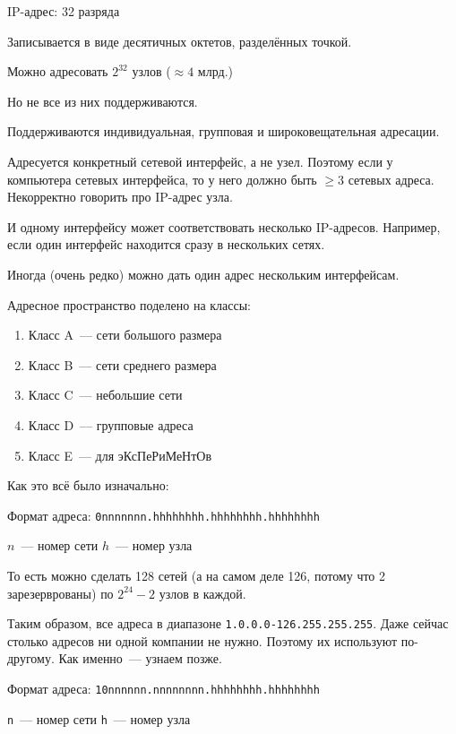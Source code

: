 
IP-адрес: 32 разряда

Записывается в виде десятичных октетов, разделённых точкой.

Можно адресовать $2^{32}$ узлов ($\approx 4\text{ млрд.}$)

Но не все из них поддерживаются.

Поддерживаются индивидуальная, групповая и широковещательная адресации.

Адресуется конкретный сетевой интерфейс, а не узел. Поэтому если у компьютера  сетевых интерфейса, то у него должно быть $\ge 3$ сетевых адреса. Некорректно говорить про IP-адрес узла.

И одному интерфейсу может соответствовать несколько IP-адресов. Например, если один интерфейс находится сразу в нескольких сетях.

Иногда (очень редко) можно дать один адрес нескольким интерфейсам.

Адресное пространство поделено на классы:

\begin{enumerate}
    \item Класс A~--- сети большого размера
    \item Класс B~--- сети среднего размера
    \item Класс C~--- небольшие сети
    \item Класс D~--- групповые адреса
    \item Класс E~--- для эКсПеРиМеНтОв
\end{enumerate}

Как это всё было изначально:


Формат адреса: {\tt 0nnnnnnn.hhhhhhhh.hhhhhhhh.hhhhhhhh}

$n$~--- номер сети
$h$~--- номер узла

То есть можно сделать 128 сетей (а на самом деле 126, потому что 2 зарезерврованы) по $2^{24}-2$ узлов в каждой.

Таким образом, все адреса в диапазоне {\tt 1.0.0.0-126.255.255.255}. Даже сейчас столько адресов ни одной компании не нужно. Поэтому их используют по-другому. Как именно~--- узнаем позже.


Формат адреса: {\tt 10nnnnnn.nnnnnnnn.hhhhhhhh.hhhhhhhh}

{\tt n}~--- номер сети
{\tt h}~--- номер узла

